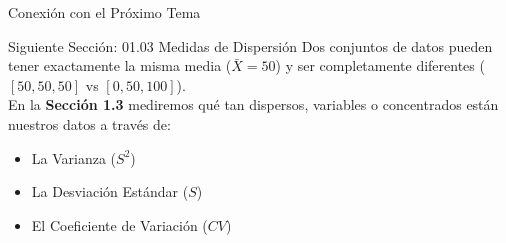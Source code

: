 \documentclass[10pt,aspectratio=169]{beamer}
\begin{document}
\begin{frame}{Conexión con el Próximo Tema}
  \begin{alertblock}{Siguiente Sección: 01.03 Medidas de Dispersión}
    Dos conjuntos de datos pueden tener exactamente la misma media ($\bar{X} = 50$) y ser completamente diferentes ($[50, 50, 50]$ vs $[0, 50, 100]$).
    \vspace{0.6em}
    \\ En la \textbf{Sección 1.3} mediremos qué tan dispersos, variables o concentrados están nuestros datos a través de:
    \begin{itemize}
      \item La Varianza ($S^2$)
      \item La Desviación Estándar ($S$)
      \item El Coeficiente de Variación ($CV$)
    \end{itemize}
  \end{alertblock}
\end{frame}
\end{document}
